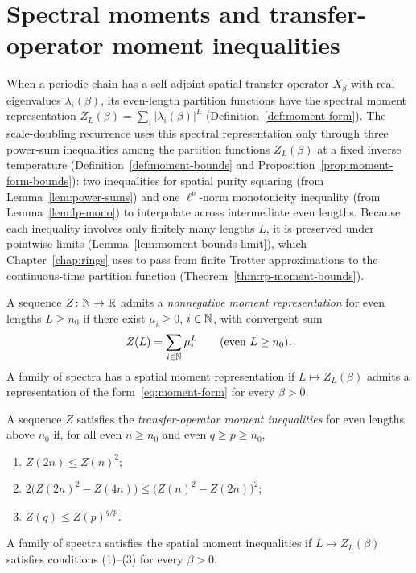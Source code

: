 \section{Spectral moments and transfer-operator moment inequalities}

When a periodic chain has a self-adjoint spatial transfer operator \(X_\beta\) with real
eigenvalues \(\lambda_i(\beta)\), its even-length partition functions have the spectral moment
representation \(Z_L(\beta) = \sum_i |\lambda_i(\beta)|^L\) (Definition~\ref{def:moment-form}). The
scale-doubling recurrence uses this spectral representation only through three power-sum
inequalities among the partition functions \(Z_L(\beta)\) at a fixed inverse temperature
(Definition~\ref{def:moment-bounds} and Proposition~\ref{prop:moment-form-bounds}): two inequalities
for spatial purity squaring (from Lemma~\ref{lem:power-sums}) and one \(\ell^p\)-norm monotonicity
inequality (from Lemma~\ref{lem:lp-mono}) to interpolate across intermediate even lengths. Because
each inequality involves only finitely many lengths \(L\), it is preserved under pointwise limits
(Lemma~\ref{lem:moment-bounds-limit}), which Chapter~\ref{chap:rings} uses to pass from finite
Trotter approximations to the continuous-time partition function (Theorem~\ref{thm:rp-moment-bounds}).

\begin{definition}
  \label{def:moment-form}
  \leanok
  A sequence \(Z \colon \mathbb{N} \to \mathbb{R}\) admits a \emph{nonnegative moment representation} for even
  lengths \(L \ge n_0\) if there exist \(\mu_i \ge 0\), \(i \in \mathbb{N}\), with convergent sum
  \begin{equation}
    \label{eq:moment-form}
    Z(L) = \sum_{i \in \mathbb{N}} \mu_i^L \qquad (\text{even } L \ge n_0).
  \end{equation}
  A family of spectra has a spatial moment representation if \(L \mapsto Z_L(\beta)\) admits a
  representation of the form~\eqref{eq:moment-form} for every \(\beta > 0\).
\end{definition}

\begin{definition}
  \label{def:moment-bounds}
  \leanok
  A sequence \(Z\) satisfies the \emph{transfer-operator moment inequalities} for even lengths above
  \(n_0\) if, for all even \(n \ge n_0\) and even \(q \ge p \ge n_0\),
  \begin{enumerate}
    \item \(Z(2n) \le Z(n)^2\);
    \item \(2\bigl(Z(2n)^2 - Z(4n)\bigr) \le \bigl(Z(n)^2 - Z(2n)\bigr)^2\);
    \item \(Z(q) \le Z(p)^{q/p}\).
  \end{enumerate}
  A family of spectra satisfies the spatial moment inequalities if \(L \mapsto Z_L(\beta)\)
  satisfies conditions (1)--(3) for every \(\beta > 0\).
\end{definition}

